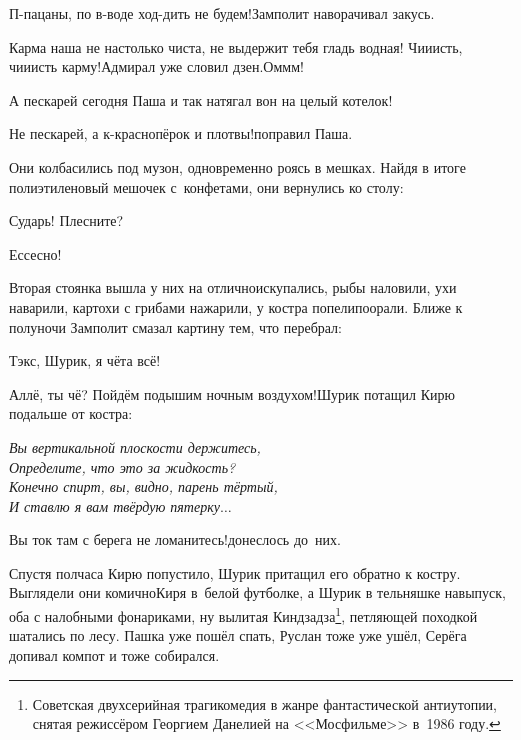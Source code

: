 \diagdash П-пацаны, по в-воде ход-дить не будем!\mdash Замполит наворачивал закусь.

\diagdash Карма наша не настолько чиста, не выдержит тебя гладь водная! Чи\sdash и\sdash исть, чи\sdash и\sdash исть карму!\mdash Адмирал уже словил дзен.\mdash Ом\sdash м\sdash м!

\diagdash А пескарей сегодня Паша и так натягал вон на целый котелок!

\diagdash Не пескарей, а к-краснопёрок и плотвы!\mdash поправил Паша.
 
Они колбасились под музон, одновременно роясь в мешках. Найдя в итоге полиэтиленовый мешочек с~конфетами, они вернулись ко столу:

\diagdash Сударь! Плесните?

\diagdash Ессесно!

Вторая стоянка вышла у них на отлично\mdash искупались, рыбы наловили, ухи наварили, картохи с грибами нажарили, у костра попели\sdash поорали. Ближе к полуночи Замполит смазал картину тем, что перебрал:

\diagdash Тэк\sdash с, Шурик, я чёта всё!

\diagdash Аллё, ты чё? Пойдём подышим ночным воздухом!\mdash Шурик потащил Кирю подальше от костра:

\noindent\textit{%
	\hspace*{2.0cm}Вы вертикальной плоскости держитесь,\\	
	\hspace*{2.0cm}Определите, что это за жидкость?\\	
	\hspace*{2.0cm}Конечно спирт, вы, видно, парень тёртый,\\	
	\hspace*{2.0cm}И ставлю я вам твёрдую пятерку$\ldots$	
}

\diagdash Вы ток там с берега не ломанитесь!\mdash донеслось до~них.

\renewcommand*{\thefootnote}{\fnsymbol{footnote}}
\setcounter{footnote}{0}
Спустя полчаса Кирю попустило, Шурик притащил его обратно к костру. Выглядели они комично\mdash Киря в~белой футболке, а Шурик в тельняшке навыпуск, оба с налобными фонариками, ну вылитая Кин\sdash дза\sdash дза\footnote{Советская двухсерийная трагикомедия в жанре фантастической антиутопии, снятая режиссёром Георгием Данелией на <<Мосфильме>> в~1986 году.}, петляющей походкой шатались по лесу. Пашка уже пошёл спать, Руслан тоже уже ушёл, Серёга допивал компот и тоже собирался.

